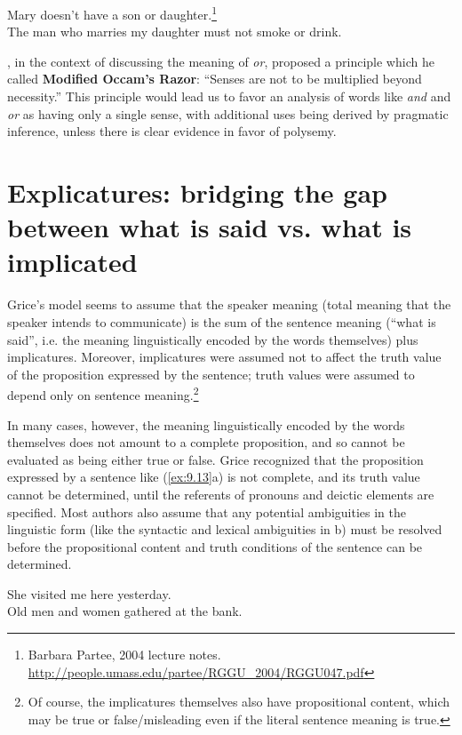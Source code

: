  
\ea \label{ex:9.12}
\ea Mary doesn’t have a son or daughter.\footnote{Barbara Partee, 2004 lecture notes. \url{http://people.umass.edu/partee/RGGU_2004/RGGU047.pdf}} \\
\ex The man who marries my daughter must not smoke or drink.
                       \z
\z


\citet[47]{Grice1978}, in the context of discussing the meaning of \textit{or}, proposed a principle which he called \textbf{Modified Occam’s Razor}: “Senses are not to be multiplied beyond necessity.” This principle would lead us to favor an analysis of words like \textit{and} and \textit{or} as having only a single sense, with additional uses being derived by pragmatic inference, unless there is clear evidence in favor of polysemy.


\section{Explicatures: bridging the gap between what is said vs. what is implicated}\label{sec:9.3}

Grice’s model seems to assume that the speaker meaning (total meaning that the speaker intends to communicate) is the sum of the sentence meaning (“what is said”, i.e. the meaning linguistically encoded by the words themselves) plus implicatures. Moreover, implicatures were assumed not to affect the truth value of the proposition expressed by the sentence; truth values were assumed to depend only on sentence meaning.\footnote{Of course, the implicatures themselves also have propositional content, which may be true or false/misleading even if the literal sentence meaning is true.}



In many cases, however, the meaning linguistically encoded by the words themselves does not amount to a complete proposition, and so cannot be evaluated as being either true or false. Grice recognized that the proposition expressed by a sentence like (\ref{ex:9.13}a) is not complete, and its truth value cannot be determined, until the referents of pronouns and deictic elements are specified. Most authors also assume that any potential ambiguities in the linguistic form (like the syntactic and lexical ambiguities in b) must be resolved before the propositional content and truth conditions of the sentence can be determined.


\ea \label{ex:9.13}
\ea She visited me here yesterday.\\
\ex Old men and women gathered at the bank.
                       \z
\z


